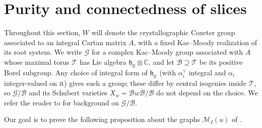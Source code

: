 \documentclass[11pt]{amsart}
\theoremstyle{definition}
\theoremstyle{remark}
\numberwithin{equation}{section}
\newcommand{\R}{\mathbb R}
\newcommand{\C}{\mathbb C}
\begin{document}
\section{Purity and connectedness of slices}\label{sec:geometry}

Throughout this section, $W$ will denote the crystallographic Coxeter group associated to an integral Cartan matrix $A$, with a fixed Kac--Moody realization of its root system. We write $\mathcal G$ for a complex Kac--Moody group associated with $A$
whose maximal torus $\mathcal T$ has Lie algebra
$\mathfrak h_\R\otimes\C$, and let $\mathcal B\supseteq\mathcal T$
be its positive Borel subgroup. Any choice of integral form of
$\mathfrak h_\R$ (with $\alpha_i^\vee$ integral and $\alpha_i$
integer-valued on it) gives such a group; these differ by central
isogenies inside $\mathcal T$, so $\mathcal G/\mathcal B$ and its
Schubert varieties $X_w=\overline{\mathcal{B}w\mathcal{B}/\mathcal{B}}$ do not depend on the choice. We refer the reader to \cite[Ch.~7]{Kumar} for background on $\mathcal{G/B}$.

Our goal is to prove the following proposition about the graphs $\mathcal M_I(u)$ of .  
\end{document}
